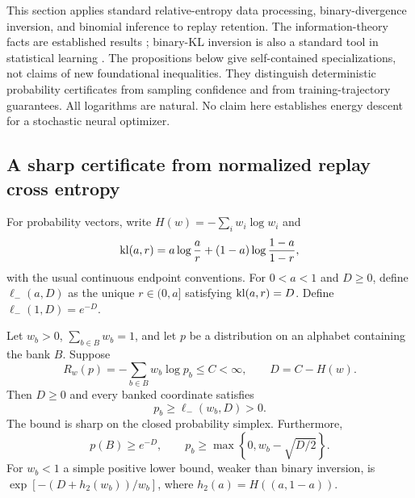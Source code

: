 

This section applies standard relative-entropy data processing, binary-divergence
inversion, and binomial inference to replay retention. The information-theory
facts are established results \cite{vanerven2014}; binary-KL inversion is also a
standard tool in statistical learning \cite{garivier2011}. The propositions
below give self-contained specializations, not claims of new foundational
inequalities. They distinguish deterministic probability certificates from
sampling confidence and from training-trajectory guarantees. All logarithms are
natural. No claim here establishes energy descent for a stochastic neural
optimizer.

\subsection{A sharp certificate from normalized replay cross entropy}
For probability vectors, write $H(w)=-\sum_iw_i\log w_i$ and
\[
 \operatorname{kl}(a,r)=a\log\frac a r+(1-a)\log\frac{1-a}{1-r},
\]
with the usual continuous endpoint conventions. For $0<a<1$ and $D\ge0$,
define $\ell_-(a,D)$ as the unique $r\in(0,a]$ satisfying
$\operatorname{kl}(a,r)=D$. Define $\ell_-(1,D)=e^{-D}$.

\begin{proposition}
Let $w_b>0$, $\sum_{b\in B}w_b=1$, and let $p$ be a distribution on an
alphabet containing the bank $B$. Suppose
\[
 R_w(p)=-\sum_{b\in B}w_b\log p_b\le C<\infty,
 \qquad D=C-H(w).
\]
Then $D\ge0$ and every banked coordinate satisfies
\[
 p_b\ge\ell_-(w_b,D)>0.
\]
The bound is sharp on the closed probability simplex. Furthermore,
\[
 p(B)\ge e^{-D},\qquad
 p_b\ge\max\left\{0,w_b-\sqrt{D/2}\right\}.
\]
For $w_b<1$ a simple positive lower bound, weaker than binary inversion, is
$\exp[-(D+h_2(w_b))/w_b]$, where $h_2(a)=H((a,1-a))$.
\end{proposition}

